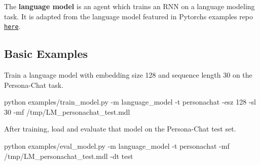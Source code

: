 The {\bfseries language model} is an agent which trains an R\+NN on a language modeling task. It is adapted from the language model featured in Pytorch\textquotesingle{}s examples repo \href{https://github.com/pytorch/examples/tree/master/word_language_model}{\tt here}.

\subsection*{Basic Examples}

Train a language model with embedding size 128 and sequence length 30 on the Persona-\/\+Chat task. 
\begin{DoxyCode}
python examples/train\_model.py -m language\_model -t personachat -esz 128 -sl 30 -mf
       /tmp/LM\_personachat\_test.mdl
\end{DoxyCode}


After training, load and evaluate that model on the Persona-\/\+Chat test set. 
\begin{DoxyCode}
python examples/eval\_model.py -m language\_model -t personachat -mf /tmp/LM\_personachat\_test.mdl -dt test
\end{DoxyCode}
 